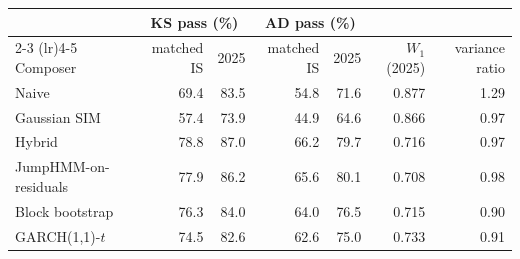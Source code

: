 \begin{tabular}{lrrrrrr}
\toprule
 & \multicolumn{2}{c}{KS pass (\%)} & \multicolumn{2}{c}{AD pass (\%)} & & \\
\cmidrule(lr){2-3} \cmidrule(lr){4-5}
Composer & matched IS & 2025 & matched IS & 2025 & $W_1$ (2025) & variance ratio \\
\midrule
Naive & 69.4 & 83.5 & 54.8 & 71.6 & 0.877 & 1.29 \\
Gaussian SIM & 57.4 & 73.9 & 44.9 & 64.6 & 0.866 & 0.97 \\
Hybrid & 78.8 & 87.0 & 66.2 & 79.7 & 0.716 & 0.97 \\
JumpHMM-on-residuals & 77.9 & 86.2 & 65.6 & 80.1 & 0.708 & 0.98 \\
Block bootstrap & 76.3 & 84.0 & 64.0 & 76.5 & 0.715 & 0.90 \\
GARCH(1,1)-$t$ & 74.5 & 82.6 & 62.6 & 75.0 & 0.733 & 0.91 \\
\bottomrule
\end{tabular}
